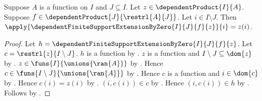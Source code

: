 \begin{proposition}\label{dependent_finite_support_extension_by_zero_off_domain}
    Suppose $A$ is a function on $I$ and $J\subseteq I$.
    Let $z\in\dependentProduct{I}{A}$.
    Suppose $f\in\dependentProduct{J}{\restrl{A}{J}}$.
    Let $i\in I\setminus J$.
    Then
        $\apply{\dependentFiniteSupportExtensionByZero{I}{J}{f}{z}}{i}
        =z(i)$.
\end{proposition}
\begin{proof}
    Let $h=\dependentFiniteSupportExtensionByZero{I}{J}{f}{z}$.
    Let $c=\restrl{z}{I\setminus J}$.
    $h$ is a function by
        .
    $z$ is a function and $I\setminus J\subseteq\dom{z}$ by
        .
    $z\in\funs{I}{\unions{\ran{A}}}$ by
        .
    Hence $c\in\funs{I\setminus J}{\unions{\ran{A}}}$ by
        .
    Hence $c$ is a function and $i\in\dom{c}$ by
        .
    Hence $c(i)=z(i)$ by .
    $(i,c(i))\in c$ by
        .
    Hence $(i,c(i))\in h$ by
        .
    Follows by .
\end{proof}

